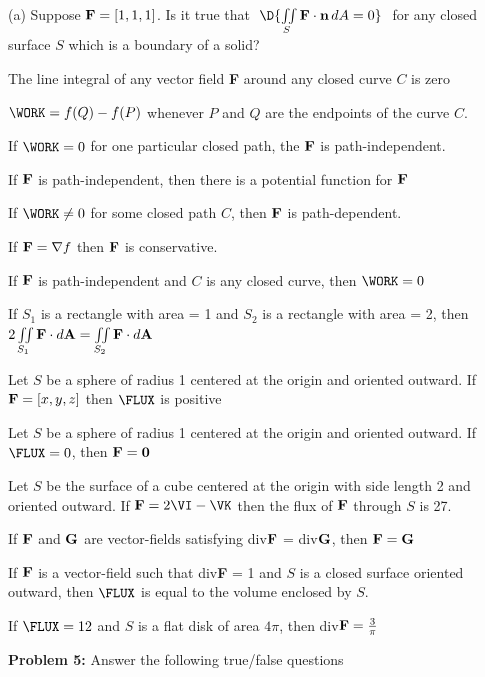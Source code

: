 \documentclass[12pt]{amsart}
\numberwithin{equation}{section}
\begin{document}
\vspace{0.1cm}

(a) \quad Suppose $\text{\text{\bf F}} = [1,1,1]$.  Is it true that \,\,$\D{\iint \limits_{S} \text{\bf F}\cdot \text{\bf n} \, dA = 0}$ \,\,for any closed surface $S$ which is a boundary of a solid?

\vspace{0.2cm}

The line integral of any vector field {\bf F} around any closed curve $C$ is zero

$\WORK = f(Q) - f(P)$ whenever $P$ and $Q$ are the endpoints of the curve $C$.

If $\WORK = 0$ for one particular closed path, the ${\bf F}$ is path-independent.

If ${\bf F}$ is path-independent, then there is a potential function for ${\bf F}$ 

If $\WORK \ne 0$ for some closed path $C$, then ${\bf F}$ is path-dependent.

If ${\bf F} = \nabla f$ then ${\bf F}$ is conservative.

If ${\bf F}$ is path-independent and $C$ is any closed curve, then $\WORK = 0$

If $S_1$ is a rectangle with area = 1 and $S_2$ is a rectangle with area = 2, then
$2\iint \limits_{S_1} {\bf F} \cdot d{\bf A} = \iint \limits_{S_2} {\bf F} \cdot d{\bf A}$

Let $S$ be a sphere of radius 1 centered at the origin and oriented outward.  If ${\bf F} = [x,y,z]$ then $\FLUX$ is positive

Let $S$ be a sphere of radius 1 centered at the origin and oriented outward.  If $\FLUX = 0$, then ${\bf F} = {\bf 0}$

Let $S$ be the surface of a cube centered at the origin with side length 2 and oriented outward.  If ${\bf F} = 2\VI - \VK$ then the flux of ${\bf F}$ through $S$ is 27.

If ${\bf F}$ and ${\bf G}$ are vector-fields satisfying div${\bf F}$ = div${\bf G}$, then ${\bf F} = {\bf G}$

If ${\bf F}$ is a vector-field such that div{\bf F} = 1 and $S$ is a closed surface oriented outward, then $\FLUX$ is equal to the volume enclosed by $S$.

If $\FLUX = 12$ and $S$ is a flat disk of area $4\pi$, then div${\bf F} = \frac{3}{\pi}$ 
\thispagestyle{empty}
\newpage
\thispagestyle{empty}

{\bf Problem 5:} Answer the following true/false questions
\end{document}
